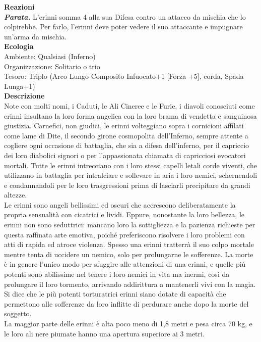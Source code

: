 \begin{multicols}{2}
\textbf{Reazioni}\\
\emph{\textbf{Parata.}} L'erinni somma 4 alla sua Difesa contro un attacco da mischia che lo colpirebbe. Per farlo, l'erinni deve poter vedere il suo attaccante e impugnare un'arma da mischia.\\
\textbf{Ecologia}\\
Ambiente: Qualsiasi (Inferno)\\
Organizzazione: Solitario o trio\\
Tesoro: Triplo (Arco Lungo Composito Infuocato+1 [Forza +5], corda, Spada Lunga+1)\\
\textbf{Descrizione}\\
Note con molti nomi, i Caduti, le Ali Cineree e le Furie, i diavoli conosciuti come erinni insultano la loro forma angelica con la loro brama di vendetta e sanguinosa giustizia. Carnefici, non giudici, le erinni volteggiano sopra i cornicioni affilati come lame di Dite, il secondo girone cosmopolita dell’Inferno, sempre attente a cogliere ogni occasione di battaglia, che sia a difesa dell’inferno, per il capriccio dei loro diabolici signori o per l’appassionata chiamata di capricciosi evocatori mortali. Tutte le erinni intrecciano con i loro stessi capelli letali corde viventi, che utilizzano in battaglia per intralciare e sollevare in aria i loro nemici, schernendoli e condannandoli per le loro trasgressioni prima di lasciarli precipitare da grandi altezze.\\
Le erinni sono angeli bellissimi ed oscuri che accrescono deliberatamente la propria sensualità con cicatrici e lividi. Eppure, nonostante la loro bellezza, le erinni non sono seduttrici: mancano loro la sottigliezza e la pazienza richieste per questa raffinata arte emotiva, poiché preferiscono risolvere i loro problemi con atti di rapida ed atroce violenza. Spesso una erinni tratterrà il suo colpo mortale mentre tenta di uccidere un nemico, solo per prolungarne le sofferenze. La morte è in genere l’unico modo per sfuggire alle attenzioni di una erinni, e quelle più potenti sono abilissime nel tenere i loro nemici in vita ma inermi, così da prolungare il loro tormento, arrivando addirittura a mantenerli vivi con la magia. Si dice che le più potenti torturatrici erinni siano dotate di capacità che permettono alle sofferenze da loro inflitte di perdurare anche dopo la morte del soggetto.\\
La maggior parte delle erinni è alta poco meno di 1,8 metri e pesa circa 70 kg, e le loro ali nere piumate hanno una apertura superiore ai 3 metri.\\


\end{multicols}
